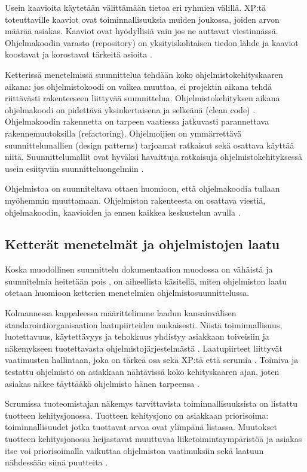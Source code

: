 \documentclass[finnish]{tktltiki2}
\theoremstyle{definition}
\theoremstyle{remark}
\begin{document}
Usein kaavioita käytetään välittämään tietoa eri ryhmien välillä. XP:tä toteuttaville kaaviot ovat toiminnallisuuksia muiden joukossa, joiden arvon määrää asiakas. Kaaviot ovat hyödyllisiä vain jos ne auttavat viestinnässä. Ohjelmakoodin varasto (repository) on yksityiskohtaisen tiedon lähde ja kaaviot koostavat ja korostavat tärkeitä asioita \cite{FOW01b}.

Ketterissä menetelmissä suunnittelua tehdään koko ohjelmistokehityskaaren aikana: jos ohjelmistokoodi on vaikea muuttaa, ei projektin aikana tehdä riittävästi rakenteeseen liittyvää suunnittelua. Ohjelmistokehityksen aikana ohjelmakoodi on pidettävä yksinkertaisena ja selkeänä (clean code) \cite{FOW01b}.
Ohjelmakoodin rakennetta on tarpeen vaatiessa jatkuvasti parannettava rakennemuutoksilla (refactoring). Ohjelmoijien on ymmärrettävä suunnittelumallien (design patterns) tarjoamat ratkaisut sekä osattava käyttää niitä. Suunnittelumallit ovat hyväksi havaittuja ratkaisuja ohjelmistokehityksessä usein esiityviin suunnitteluongelmiin \cite{FOW01b}.

Ohjelmistoa on suunniteltava ottaen huomioon, että ohjelmakoodia tullaan myöhemmin muuttamaan. Ohjelmiston rakenteesta on osattava viestiä, ohjelmakoodin, kaavioiden ja ennen kaikkea keskustelun avulla \cite{FOW01b}.

\subsection{Ketterät menetelmät ja ohjelmistojen laatu}

Koska muodollinen suunnittelu dokumentaation muodossa on vähäistä ja suunnitelmia heitetään pois \cite{FOW01b}, on aiheellista käsitellä, miten ohjelmiston laatu otetaan huomioon ketterien menetelmien ohjelmistosuunnittelussa.

Kolmannessa kappaleessa määrittelimme laadun kansainvälisen standarointiorganisaation laatupiirteiden mukaisesti. Niistä toiminnallisuus, luotettavuus, käytettävyys ja tehokkuus yhdistyy asiakkaan toiveisiin ja näkemykseen tuotettavasta ohjelmisto\-järjestelmästä \cite{KIP96}. Laatupiirteet liittyvät vaatimusten hallintaan, joka on tärkeä osa sekä XP:tä \cite{BEC99} että scrumia \cite{SCH09}. Toimiva ja testattu ohjelmisto on asiakkaan nähtävissä koko kehityskaaren ajan, joten asiakas näkee täyttääkö ohjelmisto hänen tarpeensa \cite{BEC99}.

Scrumissa tuoteomistajan näkemys tarvittavista toiminnallisuuksista on listattu tuotteen kehitysjonossa. Tuotteen kehitysjono on asiakkaan priorisoima: toiminnallisuudet jotka tuottavat arvoa ovat ylimpänä listassa. Muutokset tuotteen kehitysjonossa heijastavat muuttuvaa liiketoimintaympäristöä ja asiakas itse voi priorisoimalla vaikuttaa ohjelmiston vaatimuksiin sekä laatuun nähdessään siinä puutteita \cite{SCH09}.
\end{document}

